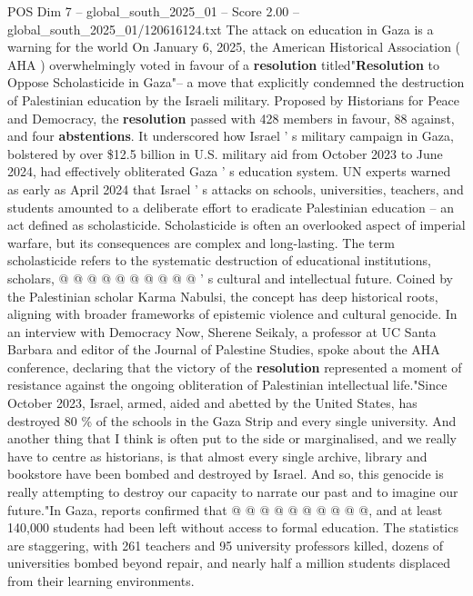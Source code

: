 \begin{textsample}{POS Dim 7 – global\_south\_2025\_01 – Score 2.00 – global\_south\_2025\_01/120616124.txt}  \label{ex:f7_pos_257}
The attack on education in Gaza is a warning for the world On January 6, 2025, the American Historical Association ( AHA ) overwhelmingly voted in favour of a \textbf{resolution} titled"\textbf{Resolution} to Oppose Scholasticide in Gaza"-- a move that explicitly condemned the destruction of Palestinian education by the Israeli military.
Proposed by Historians for Peace and Democracy, the \textbf{resolution} passed with 428 members in favour, 88 against, and four \textbf{abstentions}.
It underscored how Israel ' s military campaign in Gaza, bolstered by over \$12.5 billion in U.S. military aid from October 2023 to June 2024, had effectively obliterated Gaza ' s education system.
UN experts warned as early as April 2024 that Israel ' s attacks on schools, universities, teachers, and students amounted to a deliberate effort to eradicate Palestinian education -- an act defined as scholasticide.
Scholasticide is often an overlooked aspect of imperial warfare, but its consequences are complex and long-lasting.
The term scholasticide refers to the systematic destruction of educational institutions, scholars, @ @ @ @ @ @ @ @ @ @ ' s cultural and intellectual future.
Coined by the Palestinian scholar Karma Nabulsi, the concept has deep historical roots, aligning with broader frameworks of epistemic violence and cultural genocide.
In an interview with Democracy Now, Sherene Seikaly, a professor at UC Santa Barbara and editor of the Journal of Palestine Studies, spoke about the AHA conference, declaring that the victory of the \textbf{resolution} represented a moment of resistance against the ongoing obliteration of Palestinian intellectual life."Since October 2023, Israel, armed, aided and abetted by the United States, has destroyed 80 \% of the schools in the Gaza Strip and every single university.
And another thing that I think is often put to the side or marginalised, and we really have to centre as historians, is that almost every single archive, library and bookstore have been bombed and destroyed by Israel.
And so, this genocide is really attempting to destroy our capacity to narrate our past and to imagine our future."In Gaza, reports confirmed that @ @ @ @ @ @ @ @ @ @, and at least 140,000 students had been left without access to formal education.
The statistics are staggering, with 261 teachers and 95 university professors killed, dozens of universities bombed beyond repair, and nearly half a million students displaced from their learning environments.

\end{textsample}
